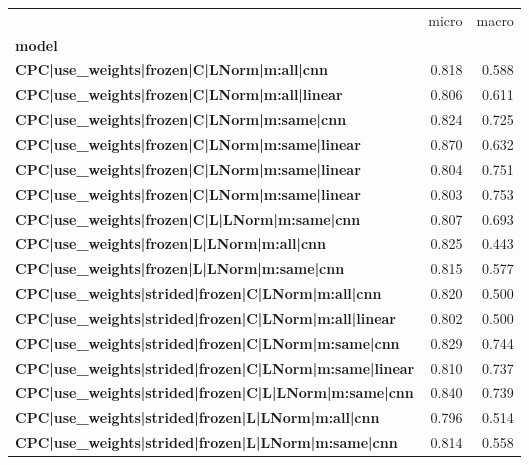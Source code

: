 \begin{adjustbox}{width=\textwidth}
\begin{tabular}{lrr}
\toprule
{} &  micro &  macro \\
\textbf{model                                               } &        &        \\
\midrule
\textbf{CPC|use\_weights|frozen|C|LNorm|m:all|cnn            } &  0.818 &  0.588 \\
\textbf{CPC|use\_weights|frozen|C|LNorm|m:all|linear         } &  0.806 &  0.611 \\
\textbf{CPC|use\_weights|frozen|C|LNorm|m:same|cnn           } &  0.824 &  0.725 \\
\textbf{CPC|use\_weights|frozen|C|LNorm|m:same|linear        } &  0.870 &  0.632 \\
\textbf{CPC|use\_weights|frozen|C|LNorm|m:same|linear        } &  0.804 &  0.751 \\
\textbf{CPC|use\_weights|frozen|C|LNorm|m:same|linear        } &  0.803 &  0.753 \\
\textbf{CPC|use\_weights|frozen|C|L|LNorm|m:same|cnn         } &  0.807 &  0.693 \\
\textbf{CPC|use\_weights|frozen|L|LNorm|m:all|cnn            } &  0.825 &  0.443 \\
\textbf{CPC|use\_weights|frozen|L|LNorm|m:same|cnn           } &  0.815 &  0.577 \\
\textbf{CPC|use\_weights|strided|frozen|C|LNorm|m:all|cnn    } &  0.820 &  0.500 \\
\textbf{CPC|use\_weights|strided|frozen|C|LNorm|m:all|linear } &  0.802 &  0.500 \\
\textbf{CPC|use\_weights|strided|frozen|C|LNorm|m:same|cnn   } &  0.829 &  0.744 \\
\textbf{CPC|use\_weights|strided|frozen|C|LNorm|m:same|linear} &  0.810 &  0.737 \\
\textbf{CPC|use\_weights|strided|frozen|C|L|LNorm|m:same|cnn } &  0.840 &  0.739 \\
\textbf{CPC|use\_weights|strided|frozen|L|LNorm|m:all|cnn    } &  0.796 &  0.514 \\
\textbf{CPC|use\_weights|strided|frozen|L|LNorm|m:same|cnn   } &  0.814 &  0.558 \\
\bottomrule
\end{tabular}
\end{adjustbox}